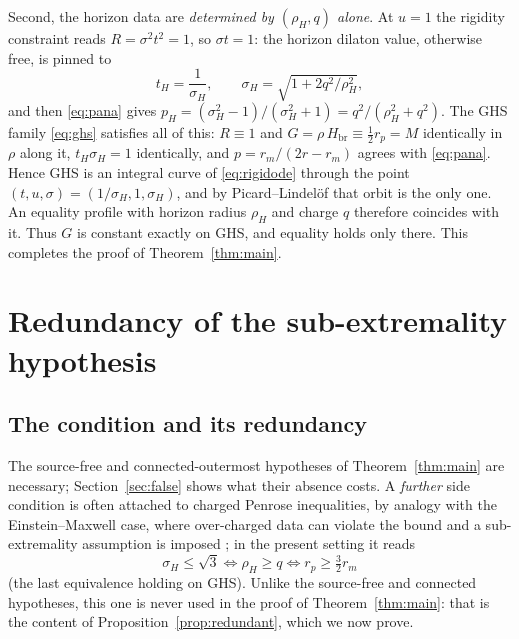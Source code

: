 \documentclass[11pt]{article}
\theoremstyle{plain}
\theoremstyle{definition}
\newcommand{\rH}{\rho_{\!H}}
\newcommand{\Hbr}{H_{\mathrm{br}}}
\begin{document}
Second, the horizon data are \emph{determined by $(\rH,q)$ alone}. At $u=1$ the rigidity constraint reads
$R=\sigma^2t^2=1$, so $\sigma t=1$: the horizon dilaton value, otherwise free, is pinned to
\begin{equation*}
  t_H=\frac{1}{\sigma_H},\qquad \sigma_H=\sqrt{1+2q^2/\rH^2},
\end{equation*}
and then \eqref{eq:pana} gives $p_H=(\sigma_H^2-1)/(\sigma_H^2+1)=q^2/(\rH^2+q^2)$. The GHS family
\eqref{eq:ghs} satisfies all of this: $R\equiv1$ and $G=\rho\,\Hbr\equiv\tfrac12 r_p=M$ identically in
$\rho$ along it, $t_H\sigma_H=1$ identically, and $p=r_m/(2r-r_m)$ agrees with \eqref{eq:pana}. Hence GHS is
an integral curve of \eqref{eq:rigidode} through the point $(t,u,\sigma)=(1/\sigma_H,1,\sigma_H)$, and by
Picard--Lindel\"of that orbit is the only one. An equality profile with horizon radius $\rH$ and charge $q$
therefore coincides with it. Thus $G$ is constant exactly on GHS, and equality holds only there. This
completes the proof of Theorem~\ref{thm:main}.

\section{Redundancy of the sub-extremality hypothesis}\label{sec:redundant}

\subsection{The condition and its redundancy}\label{sec:subext}

The source-free and connected-outermost hypotheses of Theorem~\ref{thm:main} are necessary; Section~\ref{sec:false}
shows what their absence costs. A \emph{further} side condition is often attached to charged Penrose
inequalities, by analogy with the Einstein--Maxwell case, where over-charged data can violate the bound and a
sub-extremality assumption is imposed \cite{DisconziKhuri,KWY,McCormick}; in the present setting it reads
\begin{equation}\label{eq:regime}
  \sigma_H\le\sqrt3 \iff \rH\ge q \iff r_p\ge\tfrac32 r_m
\end{equation}
(the last equivalence holding on GHS). Unlike the source-free and connected hypotheses, this one is never used
in the proof of Theorem~\ref{thm:main}: that is the content of Proposition~\ref{prop:redundant}, which we now
prove.
\end{document}

